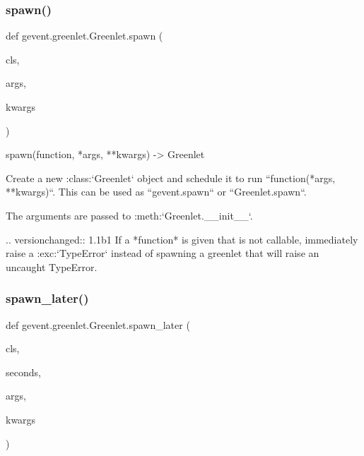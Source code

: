 \subsubsection{\texorpdfstring{spawn()}{spawn()}}
{\footnotesize\ttfamily def gevent.\+greenlet.\+Greenlet.\+spawn (\begin{DoxyParamCaption}\item[{}]{cls,  }\item[{}]{args,  }\item[{}]{kwargs }\end{DoxyParamCaption})}

\begin{DoxyVerb}spawn(function, *args, **kwargs) -> Greenlet

Create a new :class:`Greenlet` object and schedule it to run ``function(*args, **kwargs)``.
This can be used as ``gevent.spawn`` or ``Greenlet.spawn``.

The arguments are passed to :meth:`Greenlet.__init__`.

.. versionchanged:: 1.1b1
    If a *function* is given that is not callable, immediately raise a :exc:`TypeError`
    instead of spawning a greenlet that will raise an uncaught TypeError.
\end{DoxyVerb}
 \mbox{\label{classgevent_1_1greenlet_1_1_greenlet_ab3028dc939235971377102aef48ae820}} 
\subsubsection{\texorpdfstring{spawn\+\_\+later()}{spawn\_later()}}
{\footnotesize\ttfamily def gevent.\+greenlet.\+Greenlet.\+spawn\+\_\+later (\begin{DoxyParamCaption}\item[{}]{cls,  }\item[{}]{seconds,  }\item[{}]{args,  }\item[{}]{kwargs }\end{DoxyParamCaption})}

